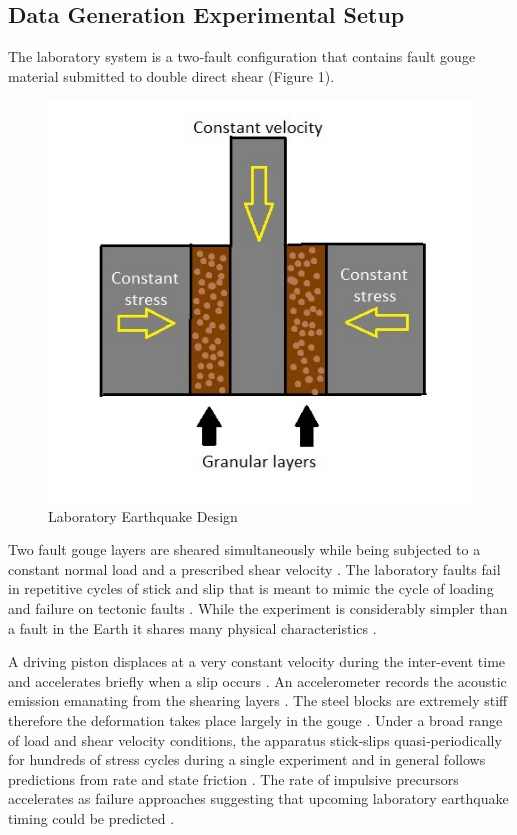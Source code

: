 \documentclass[]{llncs} %
\begin{document}
\subsection{Data Generation Experimental Setup}
The laboratory system is a two‐fault configuration that contains fault gouge material submitted to double direct shear (Figure 1)\cite{kaggle}. \par
\begin{figure}[h]
	\centering
	\includegraphics[width=.6\linewidth]{lab}
	\caption{Laboratory Earthquake Design}
	\label{fig:lab}
\end{figure}
Two fault gouge layers are sheared simultaneously while being subjected to a constant normal load and a prescribed shear velocity \cite{kaggle}. The laboratory faults fail in repetitive cycles of stick and slip that is meant to mimic the cycle of loading and failure on tectonic faults \cite{kaggle}. While the experiment is considerably simpler than a fault in the Earth it shares many physical characteristics \cite{kaggle}. \par

A driving piston displaces at a very constant velocity during the inter-event time and accelerates briefly when a slip occurs \cite{Bertrand}. An accelerometer records the acoustic emission emanating from the shearing layers \cite{Bertrand}. The steel blocks are extremely stiff therefore the deformation takes place largely in the gouge \cite{Bertrand}. Under a broad range of load and shear velocity conditions, the apparatus stick‐slips quasi‐periodically for hundreds of stress cycles during a single experiment and in general follows predictions from rate and state friction \cite{Bertrand}. The rate of impulsive precursors accelerates as failure approaches suggesting that upcoming laboratory earthquake timing could be predicted \cite{Bertrand}. \par
\end{document}
